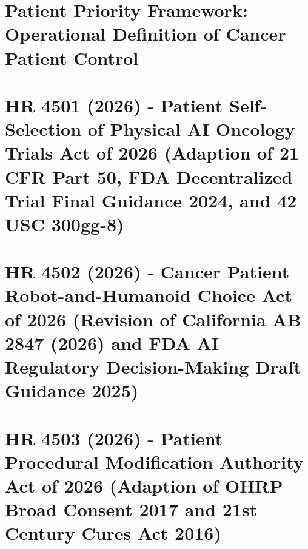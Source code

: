 \documentclass[11pt,letterpaper]{article}
\begin{document}
\section{Patient Priority Framework: Operational Definition of Cancer Patient Control}
\label{sec:patient-priority}

\newpage

\section{HR 4501 (2026) - Patient Self-Selection of Physical AI Oncology Trials Act of 2026 (Adaption of 21 CFR Part 50, FDA Decentralized Trial Final Guidance 2024, and 42 USC 300gg-8)}
\label{sec:hr4501}

\newpage

\section{HR 4502 (2026) - Cancer Patient Robot-and-Humanoid Choice Act of 2026 (Revision of California AB 2847 (2026) and FDA AI Regulatory Decision-Making Draft Guidance 2025)}
\label{sec:hr4502}

\newpage

\section{HR 4503 (2026) - Patient Procedural Modification Authority Act of 2026 (Adaption of OHRP Broad Consent 2017 and 21st Century Cures Act 2016)}
\label{sec:hr4503}

\newpage

\end{document}
